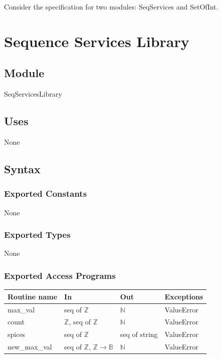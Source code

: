 \documentclass[12pt,fleqn]{examtst}
\begin{document}
\newpage

\noindent Consider the specification for two modules: SeqServices and SetOfInt.

\section* {Sequence Services Library}

\subsection*{Module}

SeqServicesLibrary

\subsection* {Uses}

None

\subsection* {Syntax}

\subsubsection* {Exported Constants}

None

\subsubsection* {Exported Types}

None 

\subsubsection* {Exported Access Programs}

\begin{tabular}{| l | l | l | p{5cm} |}
\hline
\textbf{Routine name} & \textbf{In} & \textbf{Out} & \textbf{Exceptions}\\
\hline
max\_val & seq of $\mathbb{Z}$ & $\mathbb{N}$ & ValueError\\
  \hline
count & $\mathbb{Z}$, seq of $\mathbb{Z}$ & $\mathbb{N}$ & ValueError\\
\hline
spices & seq of $\mathbb{Z}$ & seq of string & ValueError\\
\hline
new\_max\_val & seq of $\mathbb{Z}$, $\mathbb{Z} \rightarrow \mathbb{B}$ &
                                                                           $\mathbb{N}$ & ValueError\\
\hline
  
\end{tabular}
\end{document}
